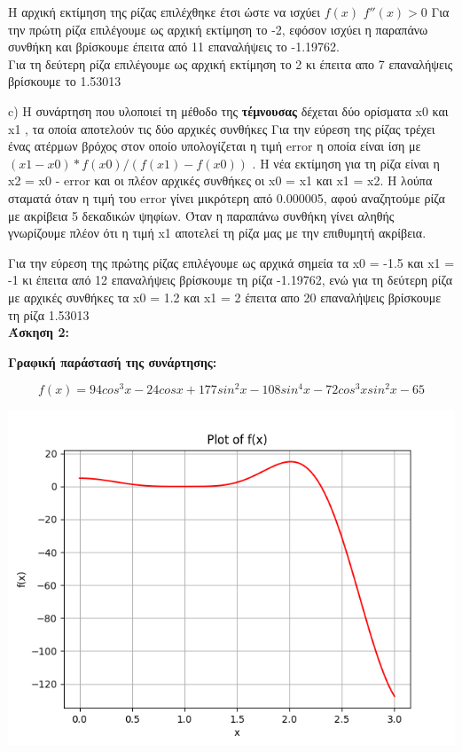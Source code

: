 \documentclass{article}
\begin{document}
Η αρχική εκτίμηση της ρίζας επιλέχθηκε έτσι ώστε να ισχύει $f(x)$ $f''(x)>0$
Για την πρώτη ρίζα επιλέγουμε ως αρχική εκτίμηση το -2, εφόσον ισχύει η παραπάνω συνθήκη και βρίσκουμε έπειτα από 11 επαναλήψεις το -1.19762.\\ Για τη δεύτερη ρίζα επιλέγουμε ως αρχική εκτίμηση το 2 κι έπειτα απο 7 επαναλήψεις βρίσκουμε το 1.53013
\par 
c)  Η συνάρτηση που υλοποιεί τη μέθοδο της \textbf{τέμνουσας} δέχεται δύο ορίσματα x0 και x1 , τα οποία αποτελούν τις δύο αρχικές συνθήκες
Για την εύρεση της ρίζας τρέχει ένας ατέρμων βρόχος στον οποίο υπολογίζεται η τιμή error η οποία είναι ίση με $(x1 - x0) *f(x0)/(f(x1)-f(x0))$ . Η νέα εκτίμηση για τη ρίζα είναι η x2 = x0 - error και οι πλέον αρχικές συνθήκες οι x0 = x1 και x1 = x2. Η λούπα σταματά όταν η τιμή του error γίνει μικρότερη από 0.000005, αφού αναζητούμε ρίζα με ακρίβεια 5 δεκαδικών ψηφίων. Όταν η παραπάνω συνθήκη γίνει αληθής γνωρίζουμε πλέον ότι η τιμή x1 αποτελεί τη ρίζα μας με την επιθυμητή ακρίβεια.
\par Για την εύρεση της πρώτης ρίζας επιλέγουμε ως αρχικά σημεία τα 
x0 = -1.5 και x1 = -1 κι έπειτα από 12 επαναλήψεις βρίσκουμε τη ρίζα -1.19762, ενώ για τη δεύτερη ρίζα με αρχικές συνθήκες τα x0 = 1.2 και x1 = 2 έπειτα απο 20 επαναλήψεις βρίσκουμε τη ρίζα 1.53013\\

\newpage
\textbf{\large{Άσκηση 2:}}\\
\par
\textbf{\large{Γραφική παράστασή της συνάρτησης:}}

\begin{equation*}
    f(x) = 94cos^3x - 24cosx + 177sin^2x - 108sin^4x - 72cos^3xsin^2x -65
\end{equation*}
\begin{center}
\includegraphics[width=.9\linewidth]{ex2_plot.png}
\end{center}
\end{document}
